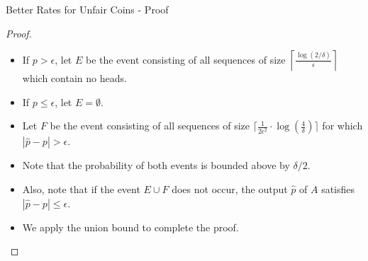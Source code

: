 \documentclass[11pt, usenames, dvipsnames]{beamer}
\begin{document}
\begin{frame}{Better Rates for Unfair Coins - Proof}
    \begin{proof}
    \begin{itemize}
        \item If $p> \epsilon$, let $E$ be the event consisting of all sequences of size $\left \lceil \frac{\log(2/\delta)}{\epsilon} \right \rceil$ which contain no heads. 
        \pause
        \item If $p \le \epsilon$, let $E=\emptyset$.
        \pause
        \item Let $F$ be the event consisting of all sequences of size $\lceil \frac{1}{2\epsilon^2} \cdot \log(\frac{4}{\delta})  \rceil$ for which $|\hat{p}-p|>\epsilon$.
        \pause
        \item Note that the probability of both events is bounded above by $\delta/2$.
        \pause
        \item  Also, note that if the event $E \cup F$ does not occur, the output $\hat{p}$ of $A$ satisfies $|\hat{p}-p| \le \epsilon$.
        \pause
        \item We apply the union bound to complete the proof. 
    \end{itemize}
\end{proof}

\end{frame}
\end{document}
